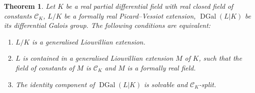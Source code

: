 \documentclass[10pt,a4paper]{amsart}
\numberwithin{equation}{section}
\newtheorem{Theorem}{Theorem}[section]
\def \DGal{\operatorname{DGal}}
\begin{document}
\begin{Theorem}\label{genL}
Let $K$ be a real partial differential field with real closed field of constants $\mathcal{C}_K$, $L/K$ be a formally real Picard--Vessiot extension, $\DGal(L|K)$ be its differential Galois group. The following conditions are equivalent:
\begin{enumerate}\itemsep=0pt
\item[$1.$] $L/K$ is a generalised Liouvillian extension.
\item[$2.$] $L$ is contained in a generalised Liouvillian extension $M$ of $K$, such that the field of constants of $M$ is $\mathcal{C}_K$ and $M$ is a formally real field.
\item[$3.$] The identity component of $\DGal(L|K)$ is solvable and $\mathcal{C}_K$-split.
\end{enumerate}
\end{Theorem}
\end{document}

